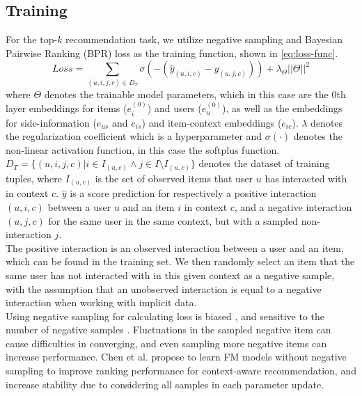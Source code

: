 \subsection{Training}\label{subsec:csgcn_is_training}
For the top-$k$ recommendation task, we utilize negative sampling and Bayesian Pairwise Ranking (BPR) loss \cite{BPR} as the training function, shown in \autoref{eq:loss-func}.
\begin{equation}\label{eq:loss-func}
    Loss = \sum_{(u,i,j,c) \in D_T} \sigma(-(\hat{y}_{(u,i,c)} - \hat{y}_{(u,j,c)})) + \lambda_\Theta ||\Theta||^2
\end{equation}
where $\Theta$ denotes the trainable model parameters, which in this case are the 0th layer embeddings for items ($e_{i}^{(0)}$) and users ($e_{u}^{(0)}$), as well as the embeddings for side-information ($e_{us}$ and $e_{is}$) and item-context embeddings ($e_{ic}$). $\lambda$ denotes the regularization coefficient which is a hyperparameter and $\sigma(\cdot)$ denotes the non-linear activation function, in this case the softplus function.\\ 
$D_T = \{(u,i,j,c) | i \in I_{(u,c)} \wedge  j \in I \setminus I_{(u,c)}\}$ denotes the dataset of training tuples, where $I_{(u,c)}$ is the set of observed items that user $u$ has interacted with in context $c$.
$\hat{y}$ is a score prediction for respectively a positive interaction $(u,i,c)$ between a user $u$ and an item $i$ in context $c$, and a negative interaction $(u,j,c)$ for the same user in the same context, but with a sampled non-interaction $j$.
\\
The positive interaction is an observed interaction between a user and an item, which can be found in the training set.
We then randomly select an item that the same user has not interacted with in this given context as a negative sample, with the assumption that an unobserved interaction is equal to a negative interaction when working with implicit data.\\ 
Using negative sampling for calculating loss is biased \cite{nonsampling, NegativeSampling}, and sensitive to the number of negative samples \cite{NCF}.
Fluctuations in the sampled negative item can cause difficulties in converging, and even sampling more negative items can increase performance.
Chen et al. \cite{nonsampling} propose to learn FM models without negative sampling to improve ranking performance for context-aware recommendation, and increase stability due to considering all samples in each parameter update.
